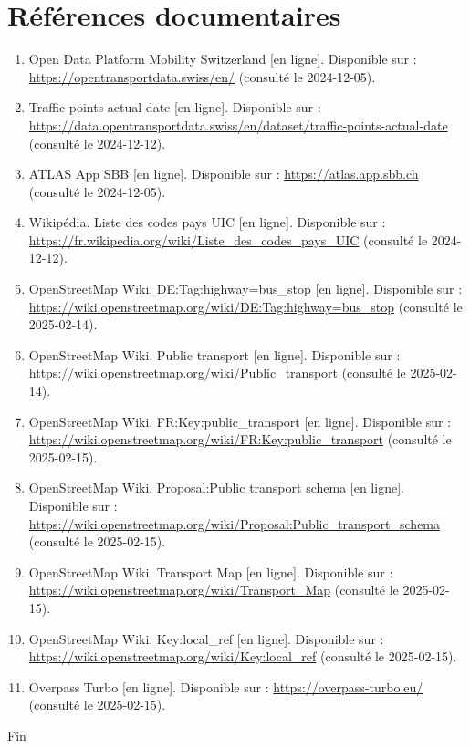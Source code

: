 \chapter*{Références documentaires}

\begin{enumerate}
    \item Open Data Platform Mobility Switzerland [en ligne]. Disponible sur : \url{https://opentransportdata.swiss/en/} (consulté le 2024-12-05). \label{ref:open_transport_data_swiss}
    \item Traffic-points-actual-date [en ligne]. Disponible sur : \url{https://data.opentransportdata.swiss/en/dataset/traffic-points-actual-date} (consulté le 2024-12-12). \label{ref:traffic_points_actual_date}
    \item ATLAS App SBB [en ligne]. Disponible sur : \url{https://atlas.app.sbb.ch} (consulté le 2024-12-05). \label{ref:atlas_app_sbb}
    \item Wikipédia. Liste des codes pays UIC [en ligne]. Disponible sur : \url{https://fr.wikipedia.org/wiki/Liste_des_codes_pays_UIC} (consulté le 2024-12-12). \label{ref:wikipedia_uic_codes}
    \item OpenStreetMap Wiki. DE:Tag:highway=bus\_stop [en ligne]. Disponible sur : \url{https://wiki.openstreetmap.org/wiki/DE:Tag:highway=bus_stop} (consulté le 2025-02-14). \label{ref:osm_bus_stop}
    \item OpenStreetMap Wiki. Public transport [en ligne]. Disponible sur : \url{https://wiki.openstreetmap.org/wiki/Public_transport} (consulté le 2025-02-14). \label{ref:osm_public_transport}
    \item OpenStreetMap Wiki. FR:Key:public\_transport [en ligne]. Disponible sur : \url{https://wiki.openstreetmap.org/wiki/FR:Key:public_transport} (consulté le 2025-02-15). \label{ref:osm_key_public_transport}
    \item OpenStreetMap Wiki. Proposal:Public transport schema [en ligne]. Disponible sur : \url{https://wiki.openstreetmap.org/wiki/Proposal:Public_transport_schema} (consulté le 2025-02-15). \label{ref:osm_proposal_public_transport}
    \item OpenStreetMap Wiki. Transport Map [en ligne]. Disponible sur : \url{https://wiki.openstreetmap.org/wiki/Transport_Map} (consulté le 2025-02-15). \label{ref:osm_transport_map}
    \item OpenStreetMap Wiki. Key:local\_ref [en ligne]. Disponible sur : \url{https://wiki.openstreetmap.org/wiki/Key:local_ref} (consulté le 2025-02-15). \label{ref:osm_local_ref}
    \item Overpass Turbo [en ligne]. Disponible sur : \url{https://overpass-turbo.eu/} (consulté le 2025-02-15). \label{ref:overpass_turbo}
\end{enumerate}
\cleardoublepage
\thispagestyle{empty}
\vfill
\begin{center}
    Fin
\end{center}

\clearpage
\thispagestyle{empty}
\null
\clearpage



